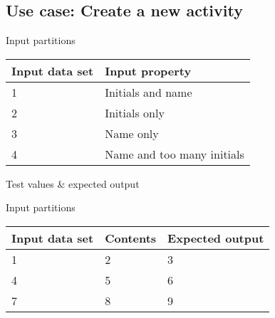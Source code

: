 \subsection{Use case: Create a new activity}

Input partitions
\begin{center}
  \begin{tabular}{| l | l |}
    \hline
	Input data set & Input property \\ \hline
    1 & Initials and name \\ \hline
    2 & Initials only \\ \hline
    3 & Name only \\ \hline
	4 & Name and too many initials \\
    \hline
  \end{tabular}
\end{center}

Test values \& expected output

Input partitions
\begin{center}
  \begin{tabular}{| l | l | l |}
    \hline
	Input data set & Contents & Expected output \\ \hline
    1 & 2 & 3 \\ \hline
    4 & 5 & 6 \\ \hline
    7 & 8 & 9 \\
    \hline
  \end{tabular}
\end{center}
